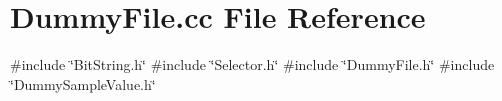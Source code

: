 \section{Dummy\+File.\+cc File Reference}
\label{DummyFile_8cc}
{\ttfamily \#include \char`\"{}Bit\+String.\+h\char`\"{}}\newline
{\ttfamily \#include \char`\"{}Selector.\+h\char`\"{}}\newline
{\ttfamily \#include \char`\"{}Dummy\+File.\+h\char`\"{}}\newline
{\ttfamily \#include \char`\"{}Dummy\+Sample\+Value.\+h\char`\"{}}\newline
